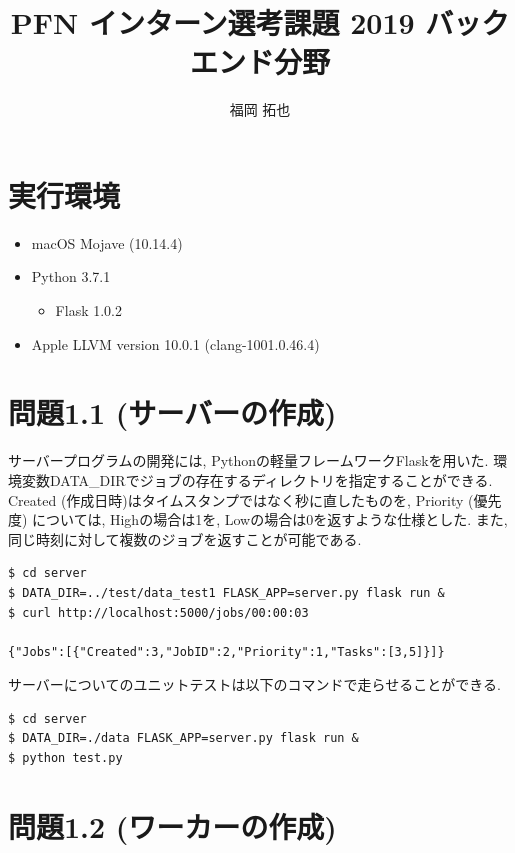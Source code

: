 


\title{PFN インターン選考課題 2019 バックエンド分野}
\author{福岡 拓也}
\date{}
\maketitle

\small


\section*{実行環境}
\begin{itemize}
    \item macOS Mojave (10.14.4)
    \item Python 3.7.1
        \begin{itemize}
            \item Flask 1.0.2
        \end{itemize}
    \item Apple LLVM version 10.0.1 (clang-1001.0.46.4)
\end{itemize}

\section*{問題1.1 (サーバーの作成)}
サーバープログラムの開発には, Pythonの軽量フレームワークFlaskを用いた. 
環境変数DATA\_DIRでジョブの存在するディレクトリを指定することができる. 
Created (作成日時)はタイムスタンプではなく秒に直したものを, 
Priority (優先度) については, Highの場合は1を, Lowの場合は0を返すような仕様とした. 
また, 同じ時刻に対して複数のジョブを返すことが可能である.

\begin{lstlisting}[]
$ cd server
$ DATA_DIR=../test/data_test1 FLASK_APP=server.py flask run &
$ curl http://localhost:5000/jobs/00:00:03

{"Jobs":[{"Created":3,"JobID":2,"Priority":1,"Tasks":[3,5]}]}
\end{lstlisting}

サーバーについてのユニットテストは以下のコマンドで走らせることができる.

\begin{lstlisting}[]
$ cd server
$ DATA_DIR=./data FLASK_APP=server.py flask run &
$ python test.py
\end{lstlisting}

\section*{問題1.2 (ワーカーの作成)}

